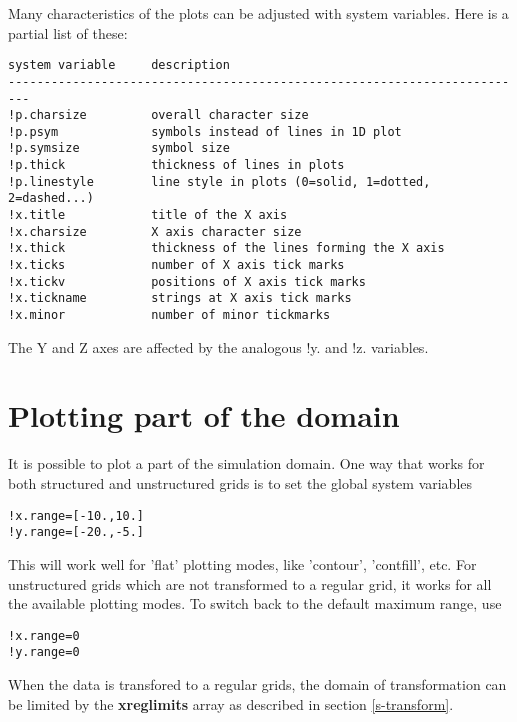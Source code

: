 \documentclass{article}
\begin{document}
   Many characteristics of the plots can be adjusted with system variables.
   Here is a partial list of these:
\begin{verbatim}
system variable     description
-------------------------------------------------------------------------
!p.charsize         overall character size
!p.psym             symbols instead of lines in 1D plot
!p.symsize          symbol size
!p.thick            thickness of lines in plots
!p.linestyle        line style in plots (0=solid, 1=dotted, 2=dashed...)
!x.title            title of the X axis
!x.charsize         X axis character size
!x.thick            thickness of the lines forming the X axis
!x.ticks            number of X axis tick marks
!x.tickv            positions of X axis tick marks
!x.tickname         strings at X axis tick marks
!x.minor            number of minor tickmarks
\end{verbatim}
  The Y and Z axes are affected by the analogous !y. and !z. variables.

\section{Plotting part of the domain \label{s-plot-part}}

   It is possible to plot a part of the simulation domain.
   One way that works for both structured and unstructured grids is
   to set the global system variables
\begin{verbatim}
!x.range=[-10.,10.]
!y.range=[-20.,-5.]
\end{verbatim}
   This will work well for 'flat' plotting modes, like 'contour',
   'contfill', etc. For unstructured grids which are not transformed
   to a regular grid, it works for all the available plotting modes.
   To switch back to the default maximum range, use
\begin{verbatim}
!x.range=0
!y.range=0
\end{verbatim}
   When the data is transfored to a regular grids, the domain of transformation
   can be limited by the {\bf xreglimits} array as described in section
   \ref{s-transform}. 
\end{document}
